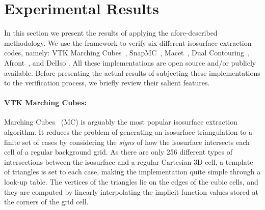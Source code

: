\section{Experimental Results}
\label{chap1:sec:res}


In this section we present the results of applying the afore-described 
methodology. We use the framework to verify six different isosurface 
extraction codes, namely: VTK Marching Cubes~\cite{lor87},
SnapMC~\cite{Raman:2008:QIM}, Macet~\cite{Dietrich:TVCG:2008},
Dual Contouring~\cite{Ju:2002:DCH:566654.566586}, Afront~\cite{Schreiner06},
and DelIso \cite{Dey07}. All these
implementations are open source and/or publicly 
available. Before presenting the actual results of subjecting these
implementations to the verification process,
we briefly review their salient features.



\paragraph*{VTK Marching Cubes:} Marching Cubes~\cite{lor87} (MC) is
arguably the most popular isosurface extraction algorithm.
It reduces the problem of generating an isosurface triangulation
to a finite set of cases by considering the \emph{signs} of 
how the isosurface intersects each cell of a regular background grid.
As there are only 256 different
types of intersections between the isosurface and a regular Cartesian 3D cell, 
a template of triangles is set to each case, making the implementation quite simple 
through a look-up table. The vertices of the triangles lie on 
the edges of the cubic cells, and they are computed by linearly interpolating 
the implicit function values stored at the corners of the grid cell. 

